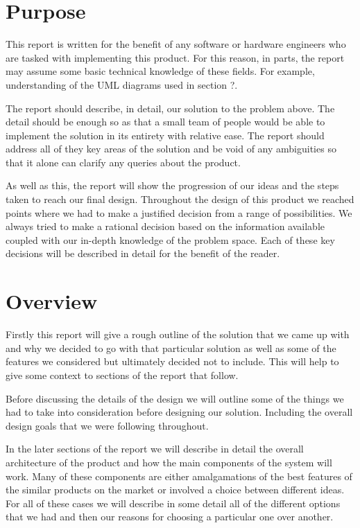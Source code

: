 \documentclass[a4paper]{report}
\begin{document}
\section{Purpose}
This report is written for the benefit of any software or hardware engineers who are tasked with implementing this product. For this reason, in parts, the report may assume some basic technical knowledge of these fields. For example, understanding of the UML diagrams used in section ?.

The report should describe, in detail, our solution to the problem above. The detail should be enough so as that a small team of people would be able to implement the solution in its entirety with relative ease. The report should address all of they key areas of the solution and be void of any ambiguities so that it alone can clarify any queries about the product.

As well as this, the report will show the progression of our ideas and the steps taken to reach our final design. Throughout the design of this product we reached points where we had to make a justified decision from a range of possibilities. We always tried to make a rational decision based on the information available coupled with our in-depth knowledge of the problem space. Each of these key decisions will be described in detail for the benefit of the reader.

\section{Overview}
Firstly this report will give a rough outline of the solution that we came up with and why we decided to go with that particular solution as well as some of the features we considered but ultimately decided not to include. This will help to give some context to sections of the report that follow.

Before discussing the details of the design we will outline some of the things we had to take into consideration before designing our solution. Including the overall design goals that we were following throughout.

In the later sections of the report we will describe in detail the overall architecture of the product and how the main components of the system will work. Many of these components are either amalgamations of the best features of the similar products on the market or involved a choice between different ideas. For all of these cases we will describe in some detail all of the different options that we had and then our reasons for choosing a particular one over another.
\end{document}
